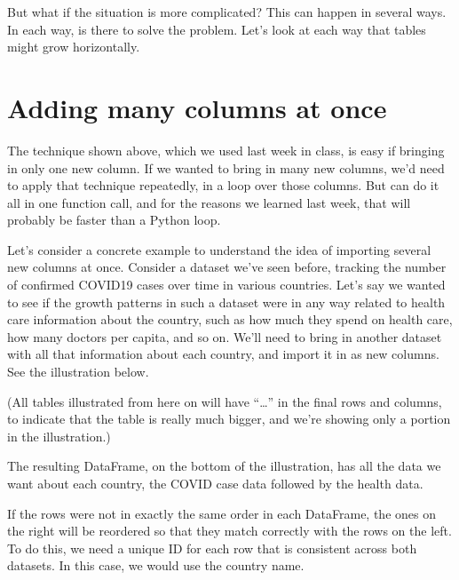\documentclass[letterpaper,10pt,english]{sphinxmanual}
\begin{document}
But what if the situation is more complicated?  This can happen in several ways.  In each way,  is there to solve the problem.  Let’s look at each way that tables might grow horizontally.


\section{Adding many columns at once}
\label{\detokenize{chapter-12-concat-and-merge:adding-many-columns-at-once}}
The technique shown above, which we used last week in class, is easy if bringing in only one new column.  If we wanted to bring in many new columns, we’d need to apply that technique repeatedly, in a loop over those columns.  But  can do it all in one function call, and for the reasons we learned last week, that will probably be faster than a Python loop.

Let’s consider a concrete example to understand the idea of importing several new columns at once.  Consider a dataset we’ve seen before, tracking the number of confirmed COVID\sphinxhyphen{}19 cases over time in various countries.  Let’s say we wanted to see if the growth patterns in such a dataset were in any way related to health care information about the country, such as how much they spend on health care, how many doctors per capita, and so on.  We’ll need to bring in another dataset with all that information about each country, and import it in as new columns.  See the illustration below.

(All tables illustrated from here on will have “…” in the final rows and columns, to indicate that the table is really much bigger, and we’re showing only a portion in the illustration.)


The resulting DataFrame, on the bottom of the illustration, has all the data we want about each country, the COVID case data followed by the health data.

If the rows were not in exactly the same order in each DataFrame, the ones on the right will be reordered so that they match correctly with the rows on the left.  To do this, we need a unique ID for each row that is consistent across both datasets.  In this case, we would use the country name.
\end{document}
